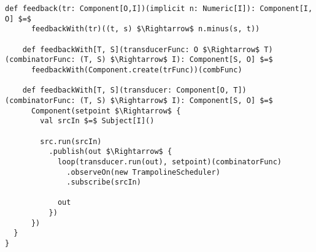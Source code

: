 \begin{lstlisting}[style=ScalaStyle, caption={Operators on \comp}, label={lst:component-operators}]
    def feedback(tr: Component[O,I])(implicit n: Numeric[I]): Component[I, O] $=$
      feedbackWith(tr)((t, s) $\Rightarrow$ n.minus(s, t))

    def feedbackWith[T, S](transducerFunc: O $\Rightarrow$ T)(combinatorFunc: (T, S) $\Rightarrow$ I): Component[S, O] $=$
      feedbackWith(Component.create(trFunc))(combFunc)

    def feedbackWith[T, S](transducer: Component[O, T])(combinatorFunc: (T, S) $\Rightarrow$ I): Component[S, O] $=$
      Component(setpoint $\Rightarrow$ {
        val srcIn $=$ Subject[I]()

        src.run(srcIn)
          .publish(out $\Rightarrow$ {
            loop(transducer.run(out), setpoint)(combinatorFunc)
              .observeOn(new TrampolineScheduler)
              .subscribe(srcIn)

            out
          })
      })
  }
}
\end{lstlisting}